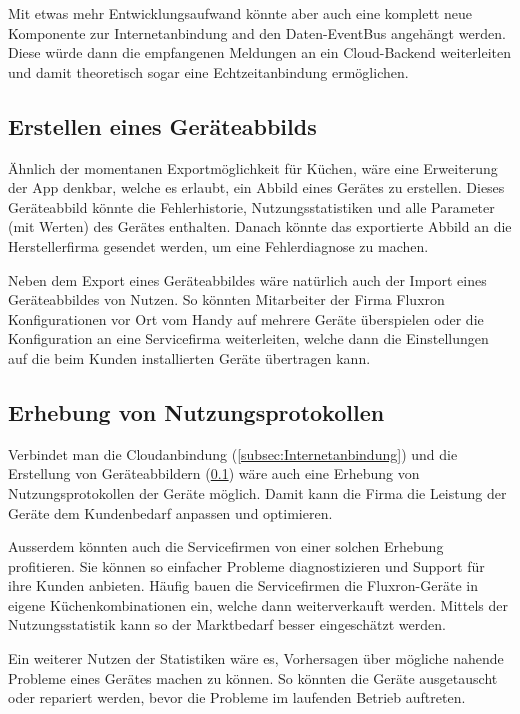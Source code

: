 Mit etwas mehr Entwicklungsaufwand könnte aber auch eine komplett neue Komponente zur Internetanbindung and den Daten-EventBus angehängt werden. Diese würde dann die empfangenen Meldungen an ein Cloud-Backend weiterleiten und damit theoretisch sogar eine Echtzeitanbindung ermöglichen.

\subsection{Erstellen eines Geräteabbilds}
\label{subsec:WeiterleitenVonFehlern}

Ähnlich der momentanen Exportmöglichkeit für Küchen, wäre eine Erweiterung der App denkbar, welche es erlaubt, ein Abbild eines Gerätes zu erstellen. Dieses Geräteabbild könnte die Fehlerhistorie, Nutzungsstatistiken und alle Parameter (mit Werten) des Gerätes enthalten. Danach könnte das exportierte Abbild an die Herstellerfirma gesendet werden, um eine Fehlerdiagnose zu machen.

Neben dem Export eines Geräteabbildes wäre natürlich auch der Import eines Geräteabbildes von Nutzen. So könnten Mitarbeiter der Firma Fluxron Konfigurationen vor Ort vom Handy auf mehrere Geräte überspielen oder die Konfiguration an eine Servicefirma weiterleiten, welche dann die Einstellungen auf die beim Kunden installierten Geräte übertragen kann.

\subsection{Erhebung von Nutzungsprotokollen}
\label{subsec:Nutzungsprotokolle}

Verbindet man die Cloudanbindung (\ref{subsec:Internetanbindung}) und die Erstellung von Geräteabbildern (\ref{subsec:WeiterleitenVonFehlern}) wäre auch eine Erhebung von Nutzungsprotokollen der Geräte möglich. Damit kann die Firma die Leistung der Geräte dem Kundenbedarf anpassen und optimieren.

Ausserdem könnten auch die Servicefirmen von einer solchen Erhebung profitieren. Sie können so einfacher Probleme diagnostizieren und Support für ihre Kunden anbieten. Häufig bauen die Servicefirmen die Fluxron-Geräte in eigene Küchenkombinationen ein, welche dann weiterverkauft werden. Mittels der Nutzungsstatistik kann so der Marktbedarf besser eingeschätzt werden.

Ein weiterer Nutzen der Statistiken wäre es, Vorhersagen über mögliche nahende Probleme eines Gerätes machen zu können. So könnten die Geräte ausgetauscht oder repariert werden, bevor die Probleme im laufenden Betrieb auftreten.